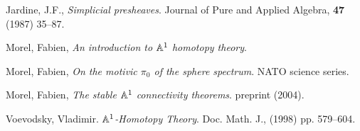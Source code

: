 \documentclass{amsart}%
\begin{document}
\begin{thebibliography}{OOOO}


     Jardine, J.F., {\it Simplicial
    presheaves}. Journal of Pure and Applied Algebra, {\bf 47} (1987)
  35--87.



     Morel, Fabien, {\it An introduction to $\mathbb{A}^1$
    homotopy theory}.

     Morel, Fabien, {\it On the motivic $\pi_0$
    of the sphere spectrum}. NATO science series.

     Morel, Fabien, {\it The stable $\mathbb{A}^1$
    connectivity theorems}. preprint (2004).











     Voevodsky, Vladimir. {\it $\mathbb{A}^1$-Homotopy
    Theory}. Doc. Math. J., (1998) pp. 579--604.

\end{thebibliography}
\end{document}
